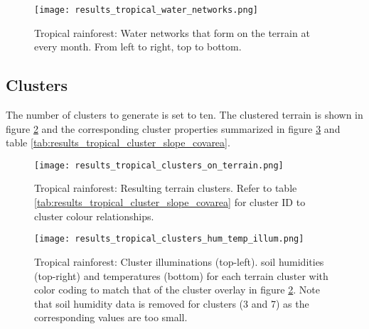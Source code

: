 \begin{figure}
\center
	\texttt{[image: results\_tropical\_water\_networks.png]}
	\caption{ Tropical rainforest: Water networks that form on the terrain at every month. From left to right, top to bottom.}
	\label{fig:results_tropical_water_networks}
\end{figure}

\subsection{Clusters}

The number of clusters to generate is set to ten. The clustered terrain is shown in figure \ref{fig:results_tropical_terrain_clusters} and the corresponding cluster properties summarized in figure \ref{fig:results_tropical_cluster_hum_temp_illum} and table \ref{tab:results_tropical_cluster_slope_covarea}. 

\begin{figure}
\center
	\texttt{[image: results\_tropical\_clusters\_on\_terrain.png]}
	\caption{ Tropical rainforest: Resulting terrain clusters. Refer to table \ref{tab:results_tropical_cluster_slope_covarea} for cluster ID to cluster colour relationships.}
	\label{fig:results_tropical_terrain_clusters}
\end{figure}

\begin{figure}
\center
	\texttt{[image: results\_tropical\_clusters\_hum\_temp\_illum.png]}
	\caption{ Tropical rainforest: Cluster illuminations (top-left). soil humidities (top-right) and temperatures (bottom) for each terrain cluster with color coding to match that of the cluster overlay in figure \ref{fig:results_tropical_terrain_clusters}. Note that soil humidity data is removed for clusters (3 and 7) as the corresponding values are too small.}
	\label{fig:results_tropical_cluster_hum_temp_illum}
\end{figure}


